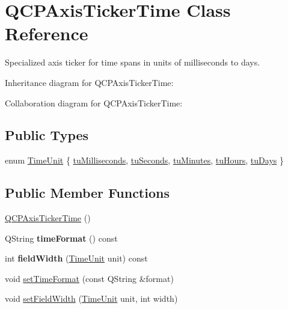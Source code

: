 \hypertarget{classQCPAxisTickerTime}{}\section{Q\+C\+P\+Axis\+Ticker\+Time Class Reference}
\label{classQCPAxisTickerTime}


Specialized axis ticker for time spans in units of milliseconds to days.  




Inheritance diagram for Q\+C\+P\+Axis\+Ticker\+Time\+:


Collaboration diagram for Q\+C\+P\+Axis\+Ticker\+Time\+:
\subsection*{Public Types}
\begin{DoxyCompactItemize}
\item 
enum \hyperlink{classQCPAxisTickerTime_a5c48ded8c6d3a1aca9b68219469fea3e}{Time\+Unit} \{ \newline
\hyperlink{classQCPAxisTickerTime_a5c48ded8c6d3a1aca9b68219469fea3ea809db637d2a7f601287c8790facc25cf}{tu\+Milliseconds}, 
\hyperlink{classQCPAxisTickerTime_a5c48ded8c6d3a1aca9b68219469fea3ea22b2c1842215272ae827eea2d1cc037d}{tu\+Seconds}, 
\hyperlink{classQCPAxisTickerTime_a5c48ded8c6d3a1aca9b68219469fea3ea682de6640daef46cffd8a080348d7d00}{tu\+Minutes}, 
\hyperlink{classQCPAxisTickerTime_a5c48ded8c6d3a1aca9b68219469fea3ea83a5713594424ba17f1f62f18f0e5935}{tu\+Hours}, 
\newline
\hyperlink{classQCPAxisTickerTime_a5c48ded8c6d3a1aca9b68219469fea3eaf9729e64545307a80a0e3527d6da6556}{tu\+Days}
 \}
\end{DoxyCompactItemize}
\subsection*{Public Member Functions}
\begin{DoxyCompactItemize}
\item 
\hyperlink{classQCPAxisTickerTime_a5145aac1d2117fdac411d9e8552cc41b}{Q\+C\+P\+Axis\+Ticker\+Time} ()
\item 
\mbox{\label{classQCPAxisTickerTime_a99ad61dc7434a7fed1850e96bf748834}} 
Q\+String {\bfseries time\+Format} () const
\item 
\mbox{\label{classQCPAxisTickerTime_a6b58a98e4d64c6764aa61a707e4a344d}} 
int {\bfseries field\+Width} (\hyperlink{classQCPAxisTickerTime_a5c48ded8c6d3a1aca9b68219469fea3e}{Time\+Unit} unit) const
\item 
void \hyperlink{classQCPAxisTickerTime_a2f30b6e5125bce4256be9ce3177088ea}{set\+Time\+Format} (const Q\+String \&format)
\item 
void \hyperlink{classQCPAxisTickerTime_adc13e54fc969be98a5c0e3fa0dbaa293}{set\+Field\+Width} (\hyperlink{classQCPAxisTickerTime_a5c48ded8c6d3a1aca9b68219469fea3e}{Time\+Unit} unit, int width)
\end{DoxyCompactItemize}
